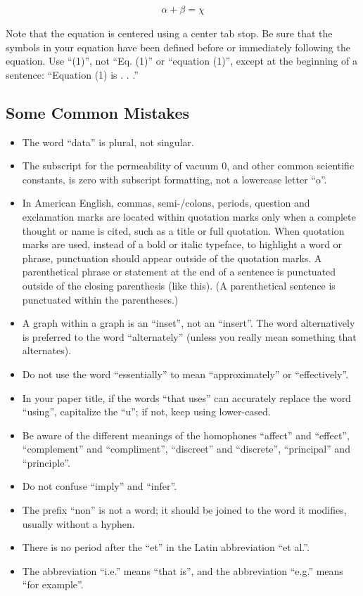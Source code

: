 \documentclass[conference]{IEEEconf}
\begin{document}
\begin{eqnarray}
\alpha + \beta = \chi
\end{eqnarray}

Note that the equation is centered using a center tab stop. Be sure that the symbols in your equation have been defined before or immediately following the equation. Use “(1)”, not “Eq. (1)” or “equation (1)”, except at the beginning of a sentence: “Equation (1) is . . .”

\subsection{Some Common Mistakes}
\begin{itemize}
\item The word “data” is plural, not singular.
\item The subscript for the permeability of vacuum 0, and other common scientific constants, is zero with subscript formatting, not a lowercase letter “o”.
\item In American English, commas, semi-/colons, periods, question and exclamation marks are located within quotation marks only when a complete thought or name is cited, such as a title or full quotation. When quotation marks are used, instead of a bold or italic typeface, to highlight a word or phrase, punctuation should appear outside of the quotation marks. A parenthetical phrase or statement at the end of a sentence is punctuated outside of the closing parenthesis (like this). (A parenthetical sentence is punctuated within the parentheses.)
\item A graph within a graph is an “inset”, not an “insert”. The word alternatively is preferred to the word “alternately” (unless you really mean something that alternates).
\item Do not use the word “essentially” to mean “approximately” or “effectively”.
\item In your paper title, if the words “that uses” can accurately replace the word “using”, capitalize the “u”; if not, keep using lower-cased.
\item Be aware of the different meanings of the homophones “affect” and “effect”, “complement” and “compliment”, “discreet” and “discrete”, “principal” and “principle”.
\item Do not confuse “imply” and “infer”.
\item The prefix “non” is not a word; it should be joined to the word it modifies, usually without a hyphen.
\item There is no period after the “et” in the Latin abbreviation “et al.”.
\item The abbreviation “i.e.” means “that is”, and the abbreviation “e.g.” means “for example”.
\end{itemize}
\end{document}
